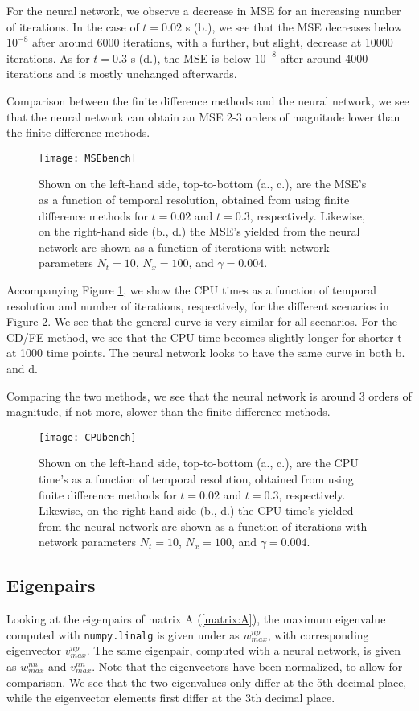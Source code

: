 For the neural network, we observe a decrease in MSE for an increasing number of iterations. In the case of $t=0.02$ s (b.), we see that the MSE decreases below $10^{-8}$ after around 6000 iterations, with a further, but slight, decrease at 10000 iterations. As for $t=0.3$ s (d.), the MSE is below $10^{-8}$ after around 4000 iterations and is mostly unchanged afterwards.

Comparison between the finite difference methods and the neural network, we see that the neural network can obtain an MSE 2-3 orders of magnitude lower than the finite difference methods.
\begin{figure}[htbp]
 	\centering
 	\texttt{[image: MSEbench]}
  \caption{Shown on the left-hand side, top-to-bottom (a., c.), are the MSE's as a function of temporal resolution, obtained from using finite difference methods for $t=0.02$ and $t=0.3$, respectively. Likewise, on the right-hand side (b., d.) the MSE's yielded from the neural network are shown as a function of iterations with network parameters $N_t = 10$, $N_x = 100$, and $\gamma = 0.004$.}
  \label{fig:MSEbench}
\end{figure}

Accompanying Figure \ref{fig:MSEbench}, we show the CPU times as a function of temporal resolution and number of iterations, respectively, for the different scenarios in Figure \ref{fig:CPUbench}. We see that the general curve is very similar for all scenarios. For the CD/FE method, we see that the CPU time becomes slightly longer for shorter t at 1000 time points. The neural network looks to have the same curve in both b. and d.

Comparing the two methods, we see that the neural network is around 3 orders of magnitude, if not more, slower than the finite difference methods.
\begin{figure}[htbp]
 	\centering
 	\texttt{[image: CPUbench]}
 	\caption{Shown on the left-hand side, top-to-bottom (a., c.), are the CPU time's as a function of temporal resolution, obtained from using finite difference methods for $t=0.02$ and $t=0.3$, respectively. Likewise, on the right-hand side (b., d.) the CPU time's yielded from the neural network are shown as a function of iterations with network parameters $N_t = 10$, $N_x = 100$, and $\gamma = 0.004$.}
  \label{fig:CPUbench}
\end{figure}


\subsection{Eigenpairs}
Looking at the eigenpairs of matrix A (\ref{matrix:A}), the maximum eigenvalue computed with  \texttt{numpy.linalg} is given under as $w_{max}^{np}$, with corresponding eigenvector $v_{max}^{np}$. The same eigenpair, computed with a neural network, is given as $w_{max}^{nn}$ and $v_{max}^{nn}$. Note that the eigenvectors have been normalized, to allow for comparison. We see that the two eigenvalues only differ at the 5th decimal place, while the eigenvector elements first differ at the 3th decimal place.

